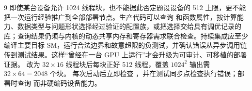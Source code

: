 \begin{solutionexercise}{9}
即使某台设备允许 1024 线程块，也不能据此否定题设设备的 512 上限，更不能把一次运行经验推广到全部部署节点。生产代码可以查询  和函数属性，按计算能力、数据类型与问题形状选择经过验证的配置族，或把选择交给具有调优记录的库；查询结果仍须与内核的动态共享内存和寄存器需求联合检查。持续集成应至少编译主要目标 SM，运行合法边界和故意超限的负测试，并确认错误从异步调用链传到测试结果。这样“曾经在一台 GPU 上运行”才会升级为可审计、可移植的部署证据。
\variantheading 改为 $32\times16$ 线程块后每块正好 512 线程，覆盖 $1024^2$ 输出需 $32\times64=2048$ 个块。
\practiceheading 每次启动后立即检查 ，并在测试同步点检查执行错误；部署时查询  而非硬编码设备能力。
\end{solutionexercise}

